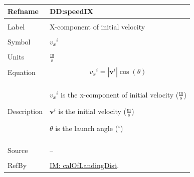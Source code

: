 \documentclass[12pt]{article}
\begin{document}
\noindent \begin{minipage}{\textwidth}
\begin{tabular}{p{} p{}}
\toprule \textbf{Refname} & \textbf{DD:speedIX}
\label{DD:speedIX}
\\ \midrule \\
Label & X-component of initial velocity
\\ \midrule \\
Symbol & ${{v_{x}}^{i}}$
\\ \midrule \\
Units & $\frac{\text{m}}{\text{s}}$
\\ \midrule \\
Equation & \begin{displaymath}
           {{v_{x}}^{i}}=|{\mathbf{v}^{i}}| \cos\left(θ\right)
           \end{displaymath}
\\ \midrule \\
Description & \begin{symbDescription}
              \item{${{v_{x}}^{i}}$ is the x-component of initial velocity ($\frac{\text{m}}{\text{s}}$)}
              \item{${\mathbf{v}^{i}}$ is the initial velocity ($\frac{\text{m}}{\text{s}}$)}
              \item{$θ$ is the launch angle (${}^{\circ}$)}
              \end{symbDescription}
\\ \midrule \\
Source & --
\\ \midrule \\
RefBy & \hyperref[IM:calOfLandingDist]{IM: calOfLandingDist}.
\\ \bottomrule \end{tabular}
\end{minipage}
\par~
\end{document}
